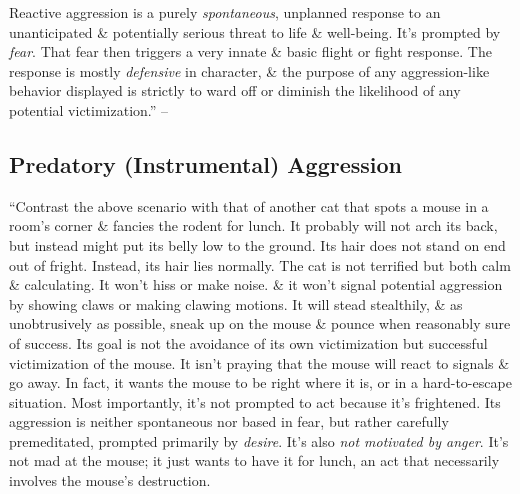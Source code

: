 \documentclass{article}
\numberwithin{equation}{section}
\begin{document}
Reactive aggression is a purely \textit{spontaneous}, unplanned response to an unanticipated \& potentially serious threat to life \& well-being. It's prompted by \textit{fear}. That fear then triggers a very innate \& basic flight or fight response. The response is mostly \textit{defensive} in character, \& the purpose of any aggression-like behavior displayed is strictly to ward off or diminish the likelihood of any potential victimization.'' -- \cite[pp. 88--89]{Simon2011}

\subsection{Predatory (Instrumental) Aggression}
``Contrast the above scenario with that of another cat that spots a mouse in a room's corner \& fancies the rodent for lunch. It probably will not arch its back, but instead might put its belly low to the ground. Its hair does not stand on end out of fright. Instead, its hair lies normally. The cat is not terrified but both calm \& calculating. It won't hiss or make noise. \& it won't signal potential aggression by showing claws or making clawing motions. It will stead stealthily, \& as unobtrusively as possible, sneak up on the mouse \& pounce when reasonably sure of success. Its goal is not the avoidance of its own victimization but successful victimization of the mouse. It isn't praying that the mouse will react to signals \& go away. In fact, it wants the mouse to be right where it is, or in a hard-to-escape situation. Most importantly, it's not prompted to act because it's frightened. Its aggression is neither spontaneous nor based in fear, but rather carefully premeditated, prompted primarily by \textit{desire}. It's also \textit{not motivated by anger}. It's not mad at the mouse; it just wants to have it for lunch, an act that necessarily involves the mouse's destruction.
\end{document}

